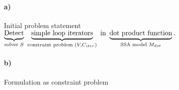 
\raggedright
\paragraph*{a)} Initial problem statement\\[1em]

\centering
{\LARGE$\underbrace{\text{Detect\vphantom{p}}}
                  _{\text{solver }S}
      \ \underbrace{\text{simple loop iterators}}
                  _{\text{constraint problem }(V,C_{iter})}
                  \ \text{in}
      \ \underbrace{\text{dot product function}}
                  _{\text{SSA model }M_{dot}}
                    \text{.}$}\\[2em]

\raggedright
\paragraph*{b)} Formulation as constraint problem\\[1em]

